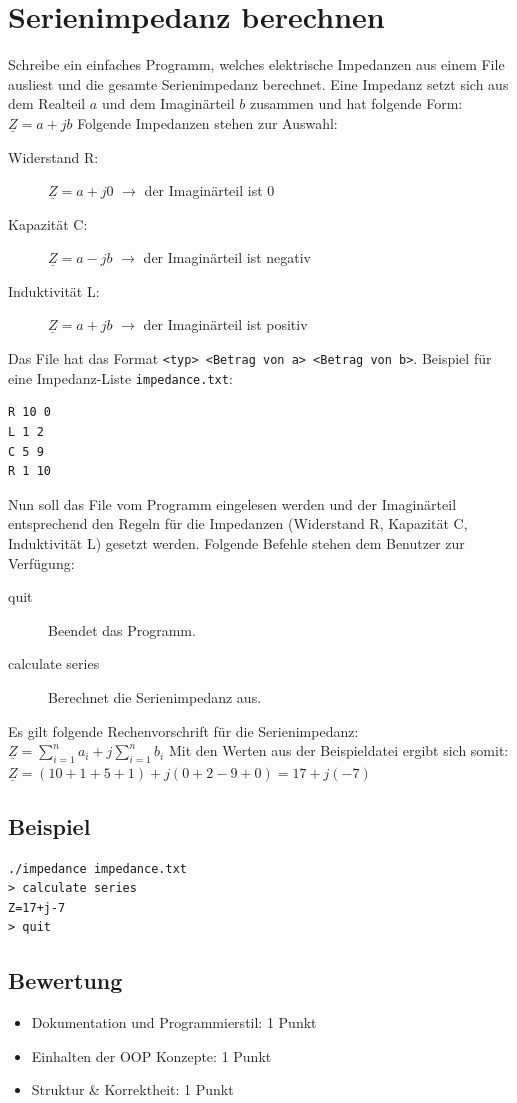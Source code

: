 \documentclass[a4paper,10pt]{article}
\begin{document}
\section*{Serienimpedanz berechnen}

Schreibe ein einfaches Programm, welches elektrische Impedanzen aus einem File ausliest und die gesamte Serienimpedanz berechnet. Eine Impedanz setzt sich aus dem Realteil $a$ und dem Imaginärteil $b$ zusammen und hat folgende Form: $\underline{Z}=a+jb$ \newline
Folgende Impedanzen stehen zur Auswahl:
\begin{description}
  \item[Widerstand R:] $\underline{Z}=a+j0$ $\rightarrow$ der Imaginärteil ist 0
  \item[Kapazität C:] $\underline{Z}=a-jb$ $\rightarrow$ der Imaginärteil ist negativ
  \item[Induktivität L:] $\underline{Z}=a+jb$ $\rightarrow$ der Imaginärteil ist positiv
\end{description}
Das File hat das Format \texttt{<typ> <Betrag von a> <Betrag von b>}.
Beispiel für eine Impedanz-Liste \texttt{impedance.txt}:
\begin{lstlisting}[frame=single]
R 10 0
L 1 2
C 5 9
R 1 10
\end{lstlisting}
Nun soll das File vom Programm eingelesen werden und der Imaginärteil entsprechend den Regeln für die Impedanzen (Widerstand R, Kapazität C, Induktivität L) gesetzt werden. Folgende Befehle stehen dem Benutzer zur Verfügung:
\begin{description}
 \item[quit] Beendet das Programm.
 \item[calculate series] Berechnet die Serienimpedanz aus.
\end{description}
Es gilt folgende Rechenvorschrift für die Serienimpedanz: $\underline{Z}=\sum\limits_{i=1}^n a_i + j\sum\limits_{i=1}^n b_i$
Mit den Werten aus der Beispieldatei ergibt sich somit: \newline$\underline{Z}=(10+1+5+1)+j(0+2-9+0)=17+j(-7)$


\subsection*{Beispiel}
\footnotesize
\begin{verbatim}
./impedance impedance.txt
> calculate series
Z=17+j-7
> quit
\end{verbatim}

\subsection*{Bewertung}
\begin{itemize}
 \item Dokumentation und Programmierstil: 1 Punkt
 \item Einhalten der OOP Konzepte: 1 Punkt
 \item Struktur \& Korrektheit: 1 Punkt
\end{itemize}
\newpage
\end{document}
